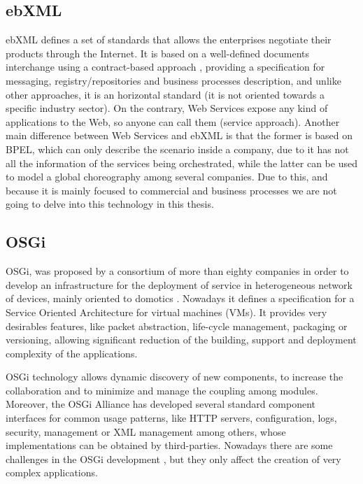 \subsection{ebXML}
ebXML defines a set of standards that allows the enterprises negotiate their products through the Internet. It is based on a well-defined documents interchange using a contract-based approach \cite{Patil03ebxmlVsWS}, providing a specification for messaging, registry/repositories and business processes description, and unlike other approaches, it is an horizontal standard (it is not oriented towards a specific industry sector). On the contrary, Web Services expose any kind of applications to the Web, so anyone can call them (service approach). Another main difference between Web Services and ebXML is that the former is based on BPEL, which can only describe the scenario inside a company, due to it has not all the information of the services being orchestrated, while the latter can be used to model a global choreography among several companies. Due to this, and because it is mainly focused to commercial and business processes we are not going to delve into this technology in this thesis.

\subsection{OSGi}

OSGi, was proposed by a consortium of more than
eighty companies in order to develop an infrastructure for the
deployment of service in heterogeneous network of devices, mainly
oriented to domotics \cite{GarciaSanchez2013Gateway}. Nowadays it defines a
specification for a Service Oriented Architecture for virtual
machines (VMs). It provides very desirables features, like
packet abstraction, life-cycle management, packaging or versioning,
allowing significant reduction of the building, support and deployment
complexity of the applications. 

OSGi technology allows dynamic discovery of new components, to increase the collaboration and to minimize and manage the coupling
among modules. Moreover, the
OSGi Alliance has developed several standard component interfaces for
common usage patterns, like HTTP servers, configuration, logs, security,
management or XML management among others, whose implementations can
be obtained by third-parties. Nowadays there are some challenges 
in the OSGi development \cite{Kriens2008OsgiChallenges}, but they only affect the creation of very complex applications.

